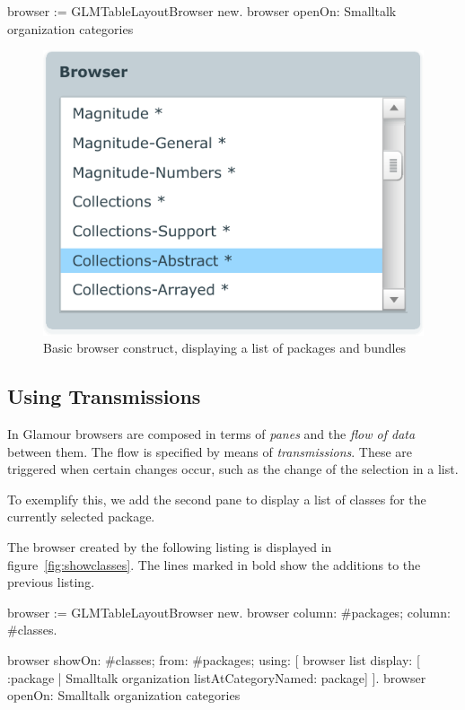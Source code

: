 \documentclass[a4paper,10pt,twoside]{book}
\begin{document}
\begin{code}{}
browser := GLMTableLayoutBrowser new.
browser openOn: Smalltalk organization  categories
\end{code}

\begin{figure}[htbp]
\centerline{\includegraphics[width=\linewidth]{helloworld.pdf}}
\caption{Basic browser construct, displaying a list of packages and bundles}
\label{fig:helloworld}
\end{figure}

\subsection{Using Transmissions}

In Glamour browsers are composed in terms of \emph{panes} and the
\emph{flow of data} between them. The flow is specified by means of
\emph{transmissions}. These are triggered when certain changes occur,
such as the change of the selection in a list.

To exemplify this, we add the second pane to display a list of classes
for the currently selected package.

The browser created by the following listing is displayed in
figure~\ref{fig:showclasses}. The lines marked in bold show the
additions to the previous listing.

\begin{code}{}
browser := GLMTableLayoutBrowser new.
browser
	column: #packages;
	column: #classes.

browser showOn: #classes; from: #packages; using: [
	browser list
		display: [ :package | Smalltalk organization listAtCategoryNamed: package]
].
browser openOn: Smalltalk organization  categories
\end{code}
\end{document}
